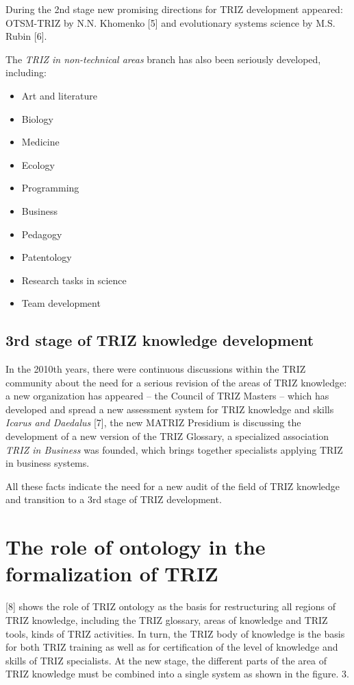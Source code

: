 \documentclass[11pt,a4paper]{article}
\begin{document}
During the 2nd stage new promising directions for TRIZ development appeared:
OTSM-TRIZ by N.N. Khomenko [5] and evolutionary systems science by M.S. Rubin
[6].

The \emph{TRIZ in non-technical areas} branch has also been seriously
developed, including:
\begin{itemize}[noitemsep]
\item Art and literature
\item Biology
\item Medicine
\item Ecology
\item Programming
\item Business
\item Pedagogy
\item Patentology
\item Research tasks in science
\item Team development
\end{itemize}

\subsection{3rd stage of TRIZ knowledge development}

In the 2010th years, there were continuous discussions within the TRIZ
community about the need for a serious revision of the areas of TRIZ
knowledge: a new organization has appeared -- the Council of TRIZ Masters --
which has developed and spread a new assessment system for TRIZ knowledge and
skills \emph{Icarus and Daedalus} [7], the new MATRIZ Presidium is discussing
the development of a new version of the TRIZ Glossary, a specialized
association \emph{TRIZ in Business} was founded, which brings together
specialists applying TRIZ in business systems.

All these facts indicate the need for a new audit of the field of TRIZ
knowledge and transition to a 3rd stage of TRIZ development.

\section{The role of ontology in the formalization of TRIZ}

[8] shows the role of TRIZ ontology as the basis for restructuring all regions
of TRIZ knowledge, including the TRIZ glossary, areas of knowledge and TRIZ
tools, kinds of TRIZ activities. In turn, the TRIZ body of knowledge is the
basis for both TRIZ training as well as for certification of the level of
knowledge and skills of TRIZ specialists. At the new stage, the different
parts of the area of TRIZ knowledge must be combined into a single system as
shown in the figure. 3.
\end{document}
